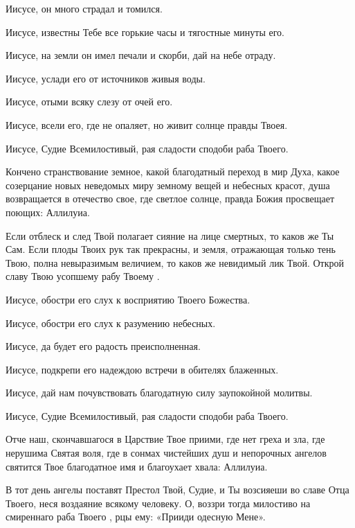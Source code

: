 \begin{mymulticols}
Иисусе, он много страдал и томился. 

Иисусе, известны Тебе все горькие часы и тягостные минуты его. 

Иисусе, на земли он имел печали и скорби, дай на небе отраду. 

Иисусе, услади его от источников живыя воды. 

Иисусе, отыми всяку слезу от очей его. 

Иисусе, всели его, где не опаляет, но живит солнце правды Твоея. 

Иисусе, Судие Всемилостивый, рая сладости сподоби раба Твоего.


Кончено странствование земное, какой благодатный переход в мир Духа, какое созерцание новых неведомых миру земному вещей и небесных красот, душа возвращается в отечество свое, где светлое солнце, правда Божия просвещает поющих: Аллилуиа.


Если отблеск и след Твой полагает сияние на лице смертных, то каков же Ты Сам. Если плоды Твоих рук так прекрасны, и земля, отражающая только тень Твою, полна невыразимым величием, то каков же невидимый лик Твой. Открой славу Твою усопшему рабу Твоему . 

Иисусе, обостри его слух к восприятию Твоего Божества. 

Иисусе, обостри его слух к разумению небесных. 

Иисусе, да будет его радость преисполненная. 

Иисусе, подкрепи его надеждою встречи в обителях блаженных. 

Иисусе, дай нам почувствовать благодатную силу заупокойной молитвы. 

Иисусе, Судие Всемилостивый, рая сладости сподоби раба Твоего.


Отче наш, скончавшагося в Царствие Твое приими, где нет греха и зла, где нерушима Святая воля, где в сонмах чистейших душ и непорочных ангелов святится Твое благодатное имя и благоухает хвала: Аллилуиа.


В тот день ангелы поставят Престол Твой, Судие, и Ты возсияеши во славе Отца Твоего, неся воздаяние всякому человеку. О, воззри тогда милостиво на смиреннаго раба Твоего , рцы ему: «Прииди одесную Мене». 


\end{mymulticols}
